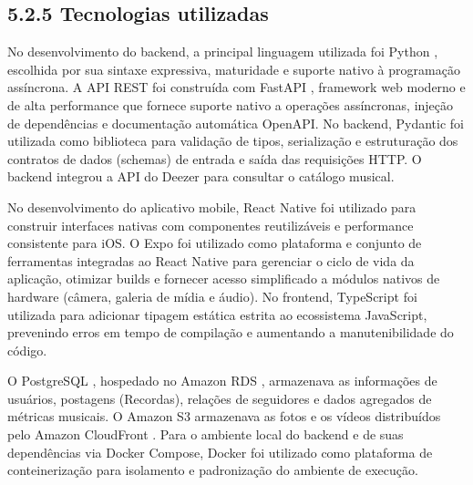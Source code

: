 \hypertarget{__RefHeading___Toc4841_3118176633}{}
\subsection*{5.2.5 Tecnologias utilizadas}
\label{ages-iv:text-h-0113}

No desenvolvimento do backend, a principal linguagem utilizada foi Python \cite{ages-iv-python}, escolhida por sua sintaxe expressiva, maturidade e suporte nativo à programação assíncrona. A API REST foi construída com FastAPI \cite{ages-iv-fastapi}, framework web moderno e de alta performance que fornece suporte nativo a operações assíncronas, injeção de dependências e documentação automática OpenAPI. No backend, Pydantic \cite{ages-iv-pydantic} foi utilizada como biblioteca para validação de tipos, serialização e estruturação dos contratos de dados (schemas) de entrada e saída das requisições HTTP. O backend integrou a API do Deezer \cite{ages-iv-deezer} para consultar o catálogo musical.\par

No desenvolvimento do aplicativo mobile, React Native \cite{ages-iv-react-native} foi utilizado para construir interfaces nativas com componentes reutilizáveis e performance consistente para iOS. O Expo \cite{ages-iv-expo} foi utilizado como plataforma e conjunto de ferramentas integradas ao React Native para gerenciar o ciclo de vida da aplicação, otimizar builds e fornecer acesso simplificado a módulos nativos de hardware (câmera, galeria de mídia e áudio). No frontend, TypeScript \cite{typescript-docs} foi utilizada para adicionar tipagem estática estrita ao ecossistema JavaScript, prevenindo erros em tempo de compilação e aumentando a manutenibilidade do código.\par

O PostgreSQL \cite{ages-iv-postgresql}, hospedado no Amazon RDS \cite{ages-iii-rds}, armazenava as informações de usuários, postagens (Recordas), relações de seguidores e dados agregados de métricas musicais. O Amazon S3 \cite{ages-iii-s3} armazenava as fotos e os vídeos distribuídos pelo Amazon CloudFront \cite{ages-iii-cloudfront}. Para o ambiente local do backend e de suas dependências via Docker Compose, Docker \cite{ages-iv-docker} foi utilizado como plataforma de conteinerização para isolamento e padronização do ambiente de execução.\par

